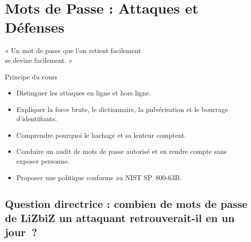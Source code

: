 
\chapter{Mots de Passe : Attaques et Défenses}
\label{chap:mdp}

\epigraph{%
    « Un mot de passe que l'on retient facilement\\
    se devine facilement. »%
}{Principe du cours}


\begin{boxobjectifs}
\begin{itemize}
    \item Distinguer les attaques en ligne et hors ligne.
    \item Expliquer la force brute, le dictionnaire, la pulvérisation et le
          bourrage d'identifiants.
    \item Comprendre pourquoi le hachage et sa lenteur comptent.
    \item Conduire un audit de mots de passe autorisé et en rendre compte
          sans exposer personne.
    \item Proposer une politique conforme au NIST SP~800-63B.
\end{itemize}
\end{boxobjectifs}

\bigskip

\section*{Question directrice : combien de mots de passe de LiZbiZ un attaquant retrouverait-il en un jour~?}

